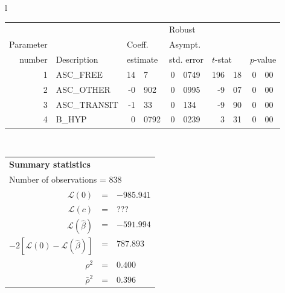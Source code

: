   \begin{tabular}{l}
\begin{tabular}{rlr@{.}lr@{.}lr@{.}lr@{.}l}
         &                       &   \multicolumn{2}{l}{}    & \multicolumn{2}{l}{Robust}  &     \multicolumn{4}{l}{}   \\
Parameter &                       &   \multicolumn{2}{l}{Coeff.}      & \multicolumn{2}{l}{Asympt.}  &     \multicolumn{4}{l}{}   \\
number &  Description                     &   \multicolumn{2}{l}{estimate}      & \multicolumn{2}{l}{std. error}  &   \multicolumn{2}{l}{$t$-stat}  &   \multicolumn{2}{l}{$p$-value}   \\

\hline

1 & ASC\_FREE & 14&7 & 0&0749 & 196&18 & 0&00 \\
2 & ASC\_OTHER & -0&902 & 0&0995 & -9&07 & 0&00 \\
3 & ASC\_TRANSIT & -1&33 & 0&134 & -9&90 & 0&00 \\
4 & B\_HYP & 0&0792 & 0&0239 & 3&31 & 0&00 \\
\hline

\end{tabular}
\\
\begin{tabular}{rcl}
\multicolumn{3}{l}{\bf Summary statistics}\\
\multicolumn{3}{l}{ Number of observations = $838$} \\
 $\mathcal{L}(0)$ &=&  $-985.941$ \\
 $\mathcal{L}(c)$ &=& ???\\
 $\mathcal{L}(\hat{\beta})$ &=& $-591.994 $  \\
 $-2[\mathcal{L}(0) -\mathcal{L}(\hat{\beta})]$ &=& $787.893$ \\
    $\rho^2$ &=&   $0.400$ \\
    $\bar{\rho}^2$ &=&    $0.396$ \\
\end{tabular}
\end{tabular}

